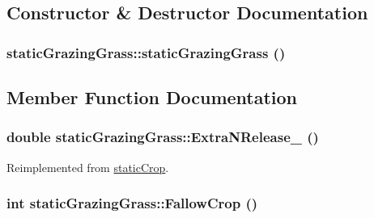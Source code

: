 \subsection{Constructor \& Destructor Documentation}
\hypertarget{classstatic_grazing_grass_a6f4b0bcad98d8c97048067cbf5d3a039}{
\subsubsection[{staticGrazingGrass}]{\setlength{\rightskip}{0pt plus 5cm}staticGrazingGrass::staticGrazingGrass ()}}
\label{classstatic_grazing_grass_a6f4b0bcad98d8c97048067cbf5d3a039}


\subsection{Member Function Documentation}
\hypertarget{classstatic_grazing_grass_adc616d1e28cd7c5257b7a80405d07abc}{
\subsubsection[{ExtraNRelease\_\-}]{\setlength{\rightskip}{0pt plus 5cm}double staticGrazingGrass::ExtraNRelease\_\- ()}}
\label{classstatic_grazing_grass_adc616d1e28cd7c5257b7a80405d07abc}


Reimplemented from \hyperlink{classstatic_crop_afe0cb8a7831afa941a37338f05227d67}{staticCrop}.\hypertarget{classstatic_grazing_grass_ab33f2f00cf6f094fb387bef72443d5d4}{
\subsubsection[{FallowCrop}]{\setlength{\rightskip}{0pt plus 5cm}int staticGrazingGrass::FallowCrop ()}}
\label{classstatic_grazing_grass_ab33f2f00cf6f094fb387bef72443d5d4}


